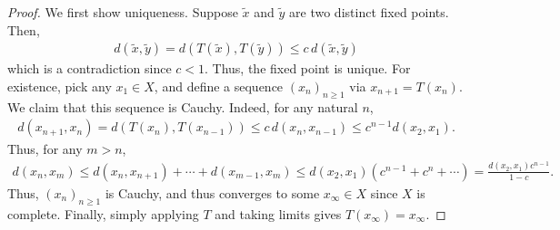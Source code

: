\begin{proof}
    We first show uniqueness. Suppose $\tilde{x}$ and $\tilde{y}$ are two distinct fixed points. Then,
    \begin{align}
        d(\tilde{x},\tilde{y}) = d(T(\tilde{x}),T(\tilde{y})) \leq c \, d(\tilde{x},\tilde{y})
    \end{align}
    which is a contradiction since $c < 1$. Thus, the fixed point is unique. For existence, pick any $x_{1} \in X$, and define a sequence $(x_{n})_{n \geq 1}$ via $x_{n+1} = T(x_{n})$. We claim that this sequence is Cauchy. Indeed, for any natural $n$,
    \begin{align}
        d(x_{n+1},x_{n}) = d(T(x_{n}),T(x_{n-1})) \leq c \, d(x_{n},x_{n-1}) \leq c^{n-1} d(x_{2},x_{1}).
    \end{align}
    Thus, for any $m > n$,
    \begin{align}
        d(x_{n},x_{m}) \leq d(x_{n},x_{n+1}) + \cdots + d(x_{m-1},x_{m}) \leq d(x_{2},x_{1}) (c^{n-1} + c^{n} + \cdots) = \frac{d(x_{2},x_{1}) c^{n-1}}{1-c}.
    \end{align}
    Thus, $(x_{n})_{n \geq 1}$ is Cauchy, and thus converges to some $x_{\infty} \in X$ since $X$ is complete. Finally, simply applying $T$ and taking limits gives $T(x_{\infty}) = x_{\infty}$.
\end{proof}



